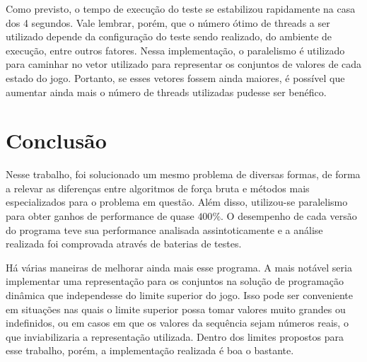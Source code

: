 \documentclass[10pt,a4paper]{article}
\numberwithin{equation}{section}
\begin{document}
Como previsto, o tempo de execução do teste se estabilizou rapidamente na casa dos 4 segundos. Vale lembrar, porém, que o número ótimo de threads a ser utilizado depende da configuração do teste sendo realizado, do ambiente de execução, entre outros fatores. Nessa implementação, o paralelismo é utilizado para caminhar no vetor utilizado para representar os conjuntos de valores de cada estado do jogo. Portanto, se esses vetores fossem ainda maiores, é possível que aumentar ainda mais o número de threads utilizadas pudesse ser benéfico.

\section{Conclusão}

Nesse trabalho, foi solucionado um mesmo problema de diversas formas, de forma a relevar as diferenças entre algoritmos de força bruta e métodos mais especializados para o problema em questão. Além disso, utilizou-se paralelismo para obter ganhos de performance de quase $400\%$. O desempenho de cada versão do programa teve sua performance analisada assintoticamente e a análise realizada foi comprovada através de baterias de testes.

Há várias maneiras de melhorar ainda mais esse programa. A mais notável seria implementar uma representação para os conjuntos na solução de programação dinâmica que independesse do limite superior do jogo. Isso pode ser conveniente em situações nas quais o limite superior possa tomar valores muito grandes ou indefinidos, ou em casos em que os valores da sequência sejam números reais, o que inviabilizaria a representação utilizada. Dentro dos limites propostos para esse trabalho, porém, a implementação realizada é boa o bastante.
\end{document}
